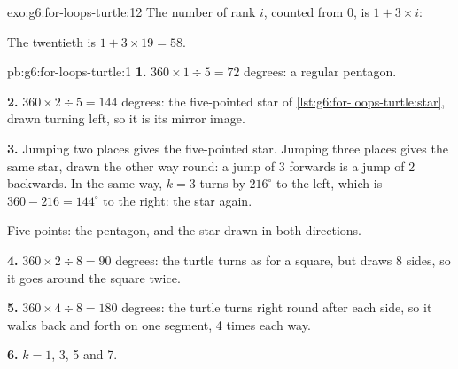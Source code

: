 \begin{solution}{exo:g6:for-loops-turtle:12}
The number of rank $i$, counted from 0, is $1 + 3 \times i$:

\label{lst:g6:for-loops-turtle:sol-sequence}

The twentieth is $1 + 3 \times 19 = 58$.
\end{solution}

\begin{solution}{pb:g6:for-loops-turtle:1}
\textbf{1.} $360 \times 1 \div 5 = 72$ degrees: a regular pentagon.

\textbf{2.} $360 \times 2 \div 5 = 144$ degrees: the five-pointed star of
\cref{lst:g6:for-loops-turtle:star}, drawn turning left, so it is its mirror
image.

\textbf{3.} Jumping two places gives the five-pointed star. Jumping three places
gives the same star, drawn the other way round: a jump of 3 forwards is a jump
of 2 backwards. In the same way, $k = 3$ turns by $216^\circ$ to the left, which
is $360 - 216 = 144^\circ$ to the right: the star again.

\begin{omfigure}

{\small Five points: the pentagon, and the star drawn in both directions.}
\end{omfigure}

\textbf{4.} $360 \times 2 \div 8 = 90$ degrees: the turtle turns as for a
square, but draws 8 sides, so it goes around the square twice.

\textbf{5.} $360 \times 4 \div 8 = 180$ degrees: the turtle turns right round
after each side, so it walks back and forth on one segment, 4 times each way.

\textbf{6.} $k = 1$, 3, 5 and 7.


\end{solution}
